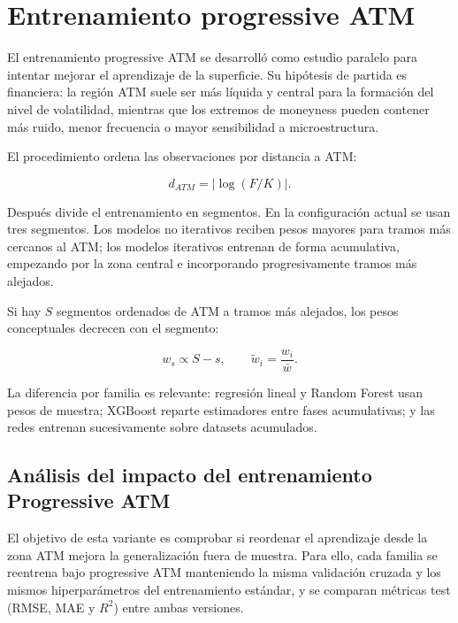 \chapter{Entrenamiento progressive ATM}
\label{app:progressive}

El entrenamiento progressive ATM se desarrolló como estudio paralelo para intentar mejorar el aprendizaje de la superficie. Su hipótesis de partida es financiera: la región ATM suele ser más líquida y central para la formación del nivel de volatilidad, mientras que los extremos de moneyness pueden contener más ruido, menor frecuencia o mayor sensibilidad a microestructura.

El procedimiento ordena las observaciones por distancia a ATM:

\begin{equation}
d_{ATM}=|\log(F/K)|.
\label{eq:dist-atm}
\end{equation}

Después divide el entrenamiento en segmentos. En la configuración actual se usan tres segmentos. Los modelos no iterativos reciben pesos mayores para tramos más cercanos al ATM; los modelos iterativos entrenan de forma acumulativa, empezando por la zona central e incorporando progresivamente tramos más alejados.

Si hay \(S\) segmentos ordenados de ATM a tramos más alejados, los pesos conceptuales decrecen con el segmento:

\begin{equation}
w_s \propto S-s,
\qquad
\tilde{w}_i=\frac{w_i}{\bar{w}}.
\label{eq:progressive-weights}
\end{equation}

La diferencia por familia es relevante: regresión lineal y Random Forest usan pesos de muestra; XGBoost reparte estimadores entre fases acumulativas; y las redes entrenan sucesivamente sobre datasets acumulados.

\section*{Análisis del impacto del entrenamiento Progressive ATM}

El objetivo de esta variante es comprobar si reordenar el aprendizaje desde la zona ATM mejora la generalización fuera de muestra. Para ello, cada familia se reentrena bajo progressive ATM manteniendo la misma validación cruzada y los mismos hiperparámetros del entrenamiento estándar, y se comparan métricas test (RMSE, MAE y \(R^2\)) entre ambas versiones.

